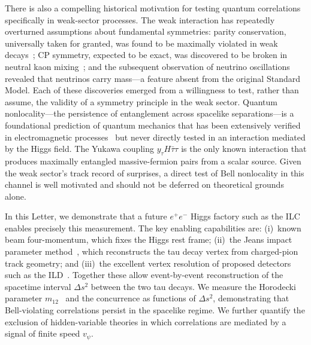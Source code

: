 \documentclass[prl,twocolumn,superscriptaddress,floatfix]{revtex4-2}
\newcommand{\ee}{e^+e^-}
\newcommand{\mtwo}{m_{12}}
\newcommand{\vpsi}{v_\psi}
\begin{document}
There is also a compelling historical motivation for testing quantum
correlations specifically in weak-sector processes.  The weak
interaction has repeatedly overturned assumptions about fundamental
symmetries: parity conservation, universally taken for granted, was
found to be maximally violated in weak decays~\cite{Wu1957,LeeYang1956};
CP symmetry, expected to be exact, was discovered to be broken in
neutral kaon mixing~\cite{CroninFitch1964}; and the subsequent
observation of neutrino oscillations~\cite{SuperK1998} revealed that
neutrinos carry mass---a feature absent from the original Standard
Model.  Each of these discoveries emerged from a willingness to test,
rather than assume, the validity of a symmetry principle in the weak
sector.  Quantum nonlocality---the persistence of entanglement across
spacelike separations---is a foundational prediction of quantum
mechanics that has been extensively verified in electromagnetic
processes~\cite{Aspect1982,Hensen2015,BigBell2018} but never directly
tested in an interaction mediated by the Higgs field.  The Yukawa
coupling $y_\tau H\bar\tau\tau$ is the only known interaction that
produces maximally entangled massive-fermion pairs from a scalar
source.  Given the weak sector's track record of surprises, a direct
test of Bell nonlocality in this channel is well motivated and should
not be deferred on theoretical grounds alone.

In this Letter, we demonstrate that a future $\ee$ Higgs factory such
as the ILC~\cite{ILC_TDR} enables precisely this measurement.  The key
enabling capabilities are: (i)~known beam four-momentum, which fixes
the Higgs rest frame; (ii)~the Jeans impact parameter
method~\cite{Jeans2015}, which reconstructs the tau decay vertex from
charged-pion track geometry; and (iii)~the excellent vertex resolution
of proposed detectors such as the
ILD~\cite{ILD_IDR}. %
Together these allow event-by-event reconstruction of the spacetime
interval $\Delta s^2$ between the two tau decays.  We measure the
Horodecki parameter $\mtwo$~\cite{Horodecki1995} and the concurrence
as functions of $\Delta s^2$, demonstrating that Bell-violating
correlations persist in the spacelike regime. We further quantify the
exclusion of hidden-variable theories in which correlations are
mediated by a signal of finite speed $\vpsi$.

\end{document}

